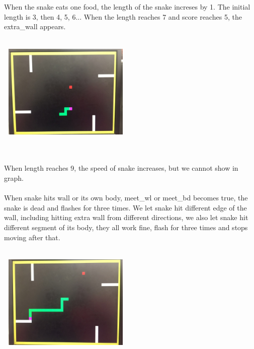 \documentclass[12pt]{article}
\begin{document}
\begin{itemize}
\begin{minipage}{\linewidth}
            \label{fig:figure8}
        \end{minipage}
\\
\\
When the snake eats one food, the length of the snake increses by 1. The initial length is 3, then 4, 5, 6... When the length reaches 7 and score reaches 5, the extra\_wall appears.
\\
\\
\begin{minipage}{\linewidth}
            \centering
            \includegraphics[width=6.5cm, height=4.5cm]{snake2.png}
            \label{fig:figure8}
        \end{minipage}
\\
\\
When length reaches 9, the speed of snake increases, but we cannot show in graph.
\\
\\
When snake hits wall or its own body, meet\_wl or meet\_bd becomes true, the snake is dead and flashes for three times. We let snake hit different edge of the wall, including hitting extra wall from different directions, we also let snake hit different segment of its body, they all work fine, flash for three times and stops moving after that.
\\
\\
\begin{minipage}{\linewidth}
            \centering
            \includegraphics[width=6.5cm, height=4.5cm]{snake4.png}
            \label{fig:figure8}
        \end{minipage}
\\
\\
 
\end{itemize}
\end{document}
